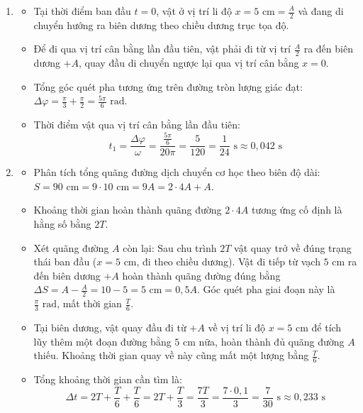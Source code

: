 \begin{ex}[{(2 điểm)}]
{\begin{enumerate}
\begin{itemize}
				\end{itemize}
				\item[c)] 
				\begin{itemize}
					\item Tại thời điểm ban đầu $t=0$, vật ở vị trí li độ $x = 5\text{ cm} = \frac{A}{2}$ và đang di chuyển hướng ra biên dương theo chiều dương trục tọa độ.
					\item Để đi qua vị trí cân bằng lần đầu tiên, vật phải đi từ vị trí $\frac{A}{2}$ ra đến biên dương $+A$, quay đầu di chuyển ngược lại qua vị trí cân bằng $x=0$.
					\item Tổng góc quét pha tương ứng trên đường tròn lượng giác đạt: $\Delta \varphi = \frac{\pi}{3} + \frac{\pi}{2} = \frac{5\pi}{6}\text{ rad}$.
					\item Thời điểm vật qua vị trí cân bằng lần đầu tiên: 
					$$t_1 = \frac{\Delta \varphi}{\omega} = \frac{\frac{5\pi}{6}}{20\pi} = \frac{5}{120} = \frac{1}{24}\text{ s} \approx 0,042\text{ s} \text{}$$
				\end{itemize}
				\item[d)] 
				\begin{itemize}
					\item Phân tích tổng quãng đường dịch chuyển cơ học theo biên độ dài: $S = 90\text{ cm} = 9 \cdot 10\text{ cm} = 9A = 2 \cdot 4A + A$.
					\item Khoảng thời gian hoàn thành quãng đường $2 \cdot 4A$ tương ứng cố định là hằng số bằng $2T$.
					\item Xét quãng đường $A$ còn lại: Sau chu trình $2T$ vật quay trở về đúng trạng thái ban đầu ($x = 5\text{ cm}$, đi theo chiều dương). Vật đi tiếp từ vạch $5\text{ cm}$ ra đến biên dương $+A$ hoàn thành quãng đường đúng bằng $\Delta S = A - \frac{A}{2} = 10 - 5 = 5\text{ cm} = 0,5A$. Góc quét pha giai đoạn này là $\frac{\pi}{3}\text{ rad}$, mất thời gian $\frac{T}{6}$.
					\item Tại biên dương, vật quay đầu đi từ $+A$ về vị trí li độ $x = 5\text{ cm}$ để tích lũy thêm một đoạn đường bằng $5\text{ cm}$ nữa, hoàn thành đủ quãng đường $A$ thiếu. Khoảng thời gian quay về này cũng mất một lượng bằng $\frac{T}{6}$.
					\item Tổng khoảng thời gian cần tìm là:
					$$\Delta t = 2T + \frac{T}{6} + \frac{T}{6} = 2T + \frac{T}{3} = \frac{7T}{3} = \frac{7 \cdot 0,1}{3} = \frac{7}{30}\text{ s} \approx 0,233\text{ s} \text{}$$
				\end{itemize}
			\end{enumerate}
		}
	\end{ex}
	
